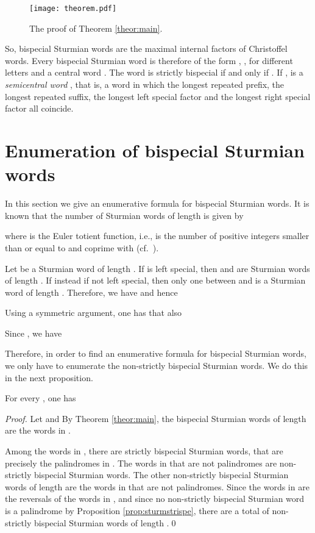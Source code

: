 \documentclass{llncs}
\begin{document}
\begin{figure}[ht]
\begin{center}
\texttt{[image: theorem.pdf]}
\caption{The proof of Theorem \ref{theor:main}.}
\label{fig:theorem}
\end{center}
\end{figure}

So, bispecial Sturmian words are the maximal internal factors of Christoffel words. Every bispecial Sturmian word is therefore of the form , , for different letters  and a central word . The word  is strictly bispecial if and only if . If ,  is a \emph{semicentral word} \cite{BuDelFi12}, that is, a word in which the longest repeated prefix, the longest repeated suffix, the longest left special factor and the longest right special factor all coincide.

\section{Enumeration of bispecial Sturmian words}\label{sec:En}


In this section we give an enumerative formula for bispecial Sturmian words. It is known that the number of Sturmian words of length  is given by

where  is the Euler totient function, i.e.,  is the number of positive integers smaller than or equal to  and coprime with  (cf.~\cite{Mig91,Lip82}).

Let  be a Sturmian word of length . If  is left special, then  and  are Sturmian words of length . If instead  if not left special, then only one between  and  is a Sturmian word of length . Therefore, we have  and hence


Using a symmetric argument, one has that also 

Since \cite{DelMi94} , we have


Therefore, in order to find an enumerative formula for bispecial Sturmian words, we only have to enumerate the non-strictly bispecial Sturmian words. We do this in the next proposition.

\begin{proposition}
For every , one has 
\end{proposition}

\begin{proof}
Let  and  By Theorem \ref{theor:main}, the bispecial Sturmian words of length  are the words in . 

Among the  words in , there are  strictly bispecial Sturmian words, that are precisely the palindromes in . The  words in  that are not palindromes are non-strictly bispecial Sturmian words. The other non-strictly bispecial Sturmian words of length  are the  words in  that are not palindromes. Since the words in  are the reversals of the words in , and since no non-strictly bispecial Sturmian word is a palindrome by Proposition \ref{prop:sturmstrispe}, there are a total of  non-strictly bispecial Sturmian words of length .\qed
\end{proof}
\end{document}

